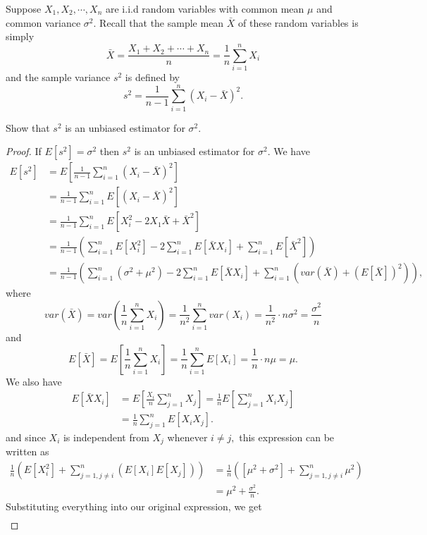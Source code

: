 \documentclass{article}
\begin{document}
\begin{enumerate}
	\newpage

	\ii Suppose $X_1, X_2, \cdots, X_n$ are i.i.d random variables with common mean $\mu$ and common variance $\sigma^2.$ Recall that the sample mean $\bar{X}$ of these random variables is simply \[\bar{X}=\frac{X_1+X_2+\cdots+X_n}{n}=\frac{1}{n}\sum_{i=1}^n X_i\] and the sample variance $s^2$ is defined by \[s^2=\frac{1}{n-1}\sum_{i=1}^n(X_i-\bar{X})^2. \]

	\begin{enumerate}
		\ii Show that $s^2$ is an unbiased estimator for $\sigma^2.$
			\begin{proof}
			If $E[s^2]=\sigma^2$ then $s^2$ is an unbiased estimator for $\sigma^2.$ We have 
			\begin{align*}
				E[s^2] &= E\left[ \frac{1}{n-1}\sum_{i=1}^n (X_i-\bar{X})^2 \right] \\
				&= \frac{1}{n-1} \sum_{i=1}^n E[(X_i-\bar{X})^2] \\
				&= \frac{1}{n-1} \sum_{i=1}^n E[X_i^2-2X_1\bar{X}+\bar{X}^2] \\
				&= \frac{1}{n-1}\left( \sum_{i=1}^n E[X_i^2] -2\sum_{i=1}^n E[\bar{X}X_i] + \sum_{i=1}^n E[\bar{X}^2] \right) \\
				&= \frac{1}{n-1}\left( \sum_{i=1}^n (\sigma^2+\mu^2) - 2\sum_{i=1}^n E[\bar{X}X_i] + \sum_{i=1}^n \left(var(\bar{X})+(E[\bar{X}])^2\right) \right), 
			\end{align*} 
			where \[var(\bar{X})=var\left(\frac{1}{n}\sum_{i=1}^n X_i\right)=\frac{1}{n^2}\sum_{i=1}^n var(X_i)=\frac{1}{n^2}\cdot n\sigma^2 = \frac{\sigma^2}{n}\] and \[E[\bar{X}]=E\left[ \frac{1}{n}\sum_{i=1}^n X_i \right] = \frac{1}{n}\sum_{i=1}^n E[X_i] = \frac{1}{n}\cdot n\mu=\mu. \] We also have
			\begin{align*}
				E[\bar{X}X_i] &= E\left[ \frac{X_i}{n}\sum_{j=1}^n X_j \right] = \frac{1}{n}E\left[ \sum_{j=1}^n X_i X_j \right] \\
				&= \frac{1}{n}\sum_{j=1}^n E[X_i X_j].
			\end{align*} and since $X_i$ is independent from $X_j$ whenever $i\neq j,$ this expression can be written as 
			\begin{align*}
				\frac{1}{n}\left(E[X_i^2] + \sum_{j=1, j\neq i}^n (E[X_i] E[X_j])\right) &= \frac{1}{n}\left([\mu^2+\sigma^2]+\sum_{j=1, j\neq i}^n \mu^2\right) \\
				&= \mu^2+\frac{\sigma^2}{n}.
			\end{align*}
			Substituting everything into our original expression, we get 
			\begin{align*}

\end{align*}
\end{proof}
\end{enumerate}
\end{enumerate}
\end{document}
